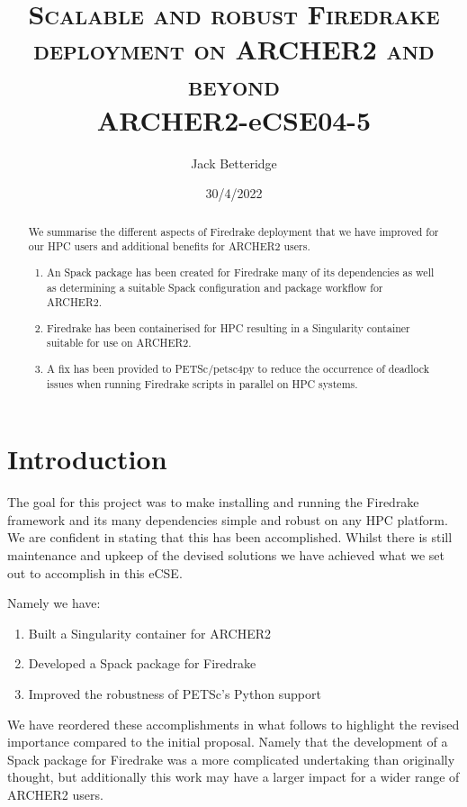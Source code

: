 \documentclass[a4paper,11pt]{article}
\title{\textsc{Scalable and robust Firedrake deployment on ARCHER2 and beyond}\\
\Large ARCHER2-eCSE04-5}
\author{Jack Betteridge}
\date{30/4/2022}
\begin{document}
\maketitle

\begin{abstract}
	We summarise the different aspects of Firedrake deployment that we have improved for our HPC users and additional benefits for ARCHER2 users.
	\begin{enumerate}
	\item An Spack package has been created for Firedrake many of its dependencies as well as determining a suitable Spack configuration and package workflow for ARCHER2.
	\item Firedrake has been containerised for HPC resulting in a Singularity container suitable for use on ARCHER2.
	\item A fix has been provided to PETSc/petsc4py to reduce the occurrence of deadlock issues when running Firedrake scripts in parallel on HPC systems.
\end{enumerate}
\end{abstract}

\section{Introduction}
\label{sec:intro}
The goal for this project was to make installing and running the Firedrake framework and its many dependencies simple and robust on any HPC platform.
We are confident in stating that this has been accomplished.
Whilst there is still maintenance and upkeep of the devised solutions we have achieved what we set out to accomplish in this eCSE.

\noindent Namely we have:
\begin{enumerate}[topsep=2pt, partopsep=0pt, itemsep=1pt, parsep=1pt]
	\item Built a Singularity container for ARCHER2
	\item Developed a Spack package for Firedrake
	\item Improved the robustness of PETSc's Python support
\end{enumerate} 

We have reordered these accomplishments in what follows to highlight the revised importance compared to the initial proposal.
Namely that the development of a Spack package for Firedrake was a more complicated undertaking than originally thought, but additionally this work may have a larger impact for a wider range of ARCHER2 users.
\end{document}
